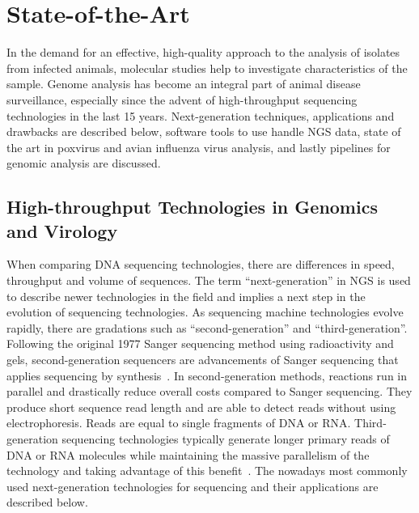 \chapter{State-of-the-Art}\label{chap:state-art}
In the demand for an effective, high-quality approach to the analysis of isolates from infected animals, molecular studies help to investigate characteristics of the sample. Genome analysis has become an integral part of animal disease surveillance, especially since the advent of high-throughput sequencing technologies in the last 15 years. Next-generation techniques, applications and drawbacks are described below, software tools to use handle NGS data, state of the art in poxvirus and avian influenza virus analysis, and lastly pipelines for genomic analysis are discussed.

\section{High-throughput Technologies in Genomics and Virology}
When comparing \ac{DNA} sequencing technologies, there are differences in speed, throughput and volume of sequences. The term ``next-generation'' in \ac{NGS} is used to describe newer technologies in the field and implies a next step in the evolution of sequencing technologies. As sequencing machine technologies evolve rapidly, there are gradations such as ``second-generation'' and ``third-generation''. Following the original 1977 Sanger sequencing method using radioactivity and gels, second-generation sequencers are advancements of Sanger sequencing that applies sequencing by synthesis~\cite{mardis2008next}. In second-generation methods, reactions run in parallel and drastically reduce overall costs compared to Sanger sequencing. They produce short sequence read length and are able to detect reads without using electrophoresis. Reads are equal to single fragments of \ac{DNA} or \ac{RNA}.
Third-generation sequencing technologies typically generate longer primary reads of \ac{DNA} or \ac{RNA} molecules while maintaining the massive parallelism of the technology and taking advantage of this benefit~\cite{slatko2018overview}. The nowadays most commonly used next-generation technologies for sequencing and their applications are described below.

